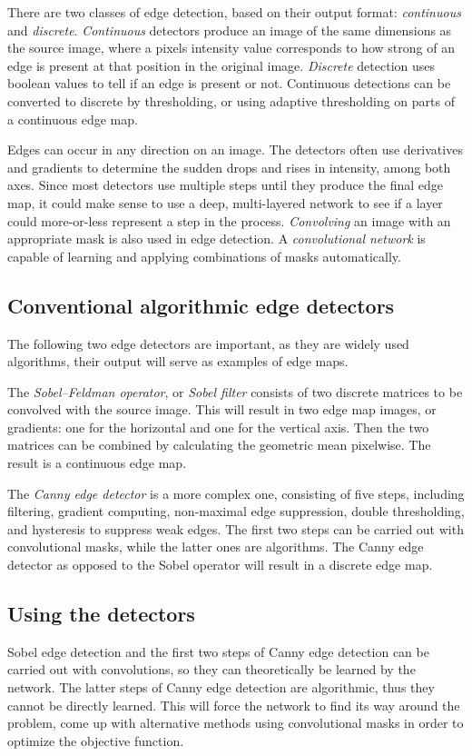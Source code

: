 \documentclass[12pt]{report}
\begin{document}
There are two classes of edge detection, based on their output format: \textit{continuous} and \textit{discrete}. \textit{Continuous} detectors produce an image of the same dimensions as the source image, where a pixels intensity value corresponds to how strong of an edge is present at that position in the original image. \textit{Discrete} detection uses boolean values to tell if an edge is present or not. Continuous detections can be converted to discrete by thresholding, or using adaptive thresholding on parts of a continuous edge map.

Edges can occur in any direction on an image. The detectors often use derivatives and gradients to determine the sudden drops and rises in intensity, among both axes. Since most detectors use multiple steps until they produce the final edge map, it could make sense to use a deep, multi-layered network to see if a layer could more-or-less represent a step in the process. \textit{Convolving} an image with an appropriate mask is also used in edge detection. A \textit{convolutional network} is capable of learning and applying combinations of masks automatically.
\subsection{Conventional algorithmic edge detectors}
The following two edge detectors are important, as they are widely used algorithms, their output will serve as examples of edge maps.

The \textit{Sobel–Feldman operator}, or \textit{Sobel filter} \cite{sobel} consists of two discrete matrices to be convolved with the source image. This will result in two edge map images, or gradients: one for the horizontal and one for the vertical axis. Then the two matrices can be combined by calculating the geometric mean pixelwise. The result is a continuous edge map.

The \textit{Canny edge detector} \cite{canny} is a more complex one, consisting of five steps, including filtering, gradient computing, non-maximal edge suppression, double thresholding, and hysteresis to suppress weak edges. The first two steps can be carried out with convolutional masks, while the latter ones are algorithms. The Canny edge detector as opposed to the Sobel operator will result in a discrete edge map.
\subsection{Using the detectors}
Sobel edge detection and the first two steps of Canny edge detection can be carried out with convolutions, so they can theoretically be learned by the network. The latter steps of Canny edge detection are algorithmic, thus they cannot be directly learned.
This will force the network to find its way around the problem, come up with alternative methods using convolutional masks in order to optimize the objective function.
\end{document}
